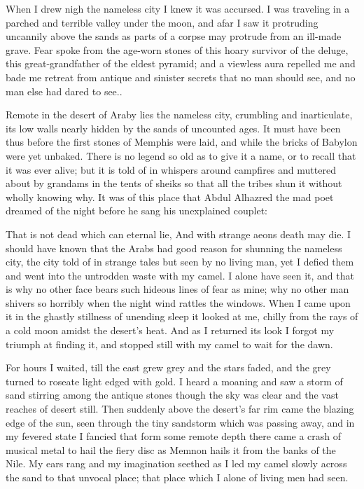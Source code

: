 \documentclass{article}
\begin{document}
When I drew nigh the nameless city I knew it was accursed. I was traveling in a
parched and terrible valley under the moon, and afar I saw it protruding
uncannily above the sands as parts of a corpse may protrude from an ill-made
grave. Fear spoke from the age-worn stones of this hoary survivor of the
deluge, this great-grandfather of the eldest pyramid; and a viewless aura
repelled me and bade me retreat from antique and sinister secrets that no man
should see, and no man else had dared to see..

Remote in the desert of Araby lies the nameless city, crumbling and
inarticulate, its low walls nearly hidden by the sands of uncounted ages. It
must have been thus before the first stones of Memphis were laid, and while the
bricks of Babylon were yet unbaked. There is no legend so old as to give it a
name, or to recall that it was ever alive; but it is told of in whispers around
campfires and muttered about by grandams in the tents of sheiks so that all the
tribes shun it without wholly knowing why. It was of this place that Abdul
Alhazred the mad poet dreamed of the night before he sang his unexplained
couplet:

That is not dead which can eternal lie, And with strange aeons death may die.
I should have known that the Arabs had good reason for shunning the nameless
city, the city told of in strange tales but seen by no living man, yet I defied
them and went into the untrodden waste with my camel. I alone have seen it, and
that is why no other face bears such hideous lines of fear as mine; why no
other man shivers so horribly when the night wind rattles the windows. When I
came upon it in the ghastly stillness of unending sleep it looked at me, chilly
from the rays of a cold moon amidst the desert's heat. And as I returned its
look I forgot my triumph at finding it, and stopped still with my camel to wait
for the dawn.

For hours I waited, till the east grew grey and the stars faded, and the grey
turned to roseate light edged with gold. I heard a moaning and saw a storm of
sand stirring among the antique stones though the sky was clear and the vast
reaches of desert still. Then suddenly above the desert's far rim came the
blazing edge of the sun, seen through the tiny sandstorm which was passing
away, and in my fevered state I fancied that form some remote depth there came
a crash of musical metal to hail the fiery disc as Memnon hails it from the
banks of the Nile. My ears rang and my imagination seethed as I led my camel
slowly across the sand to that unvocal place; that place which I alone of
living men had seen.
\end{document}
